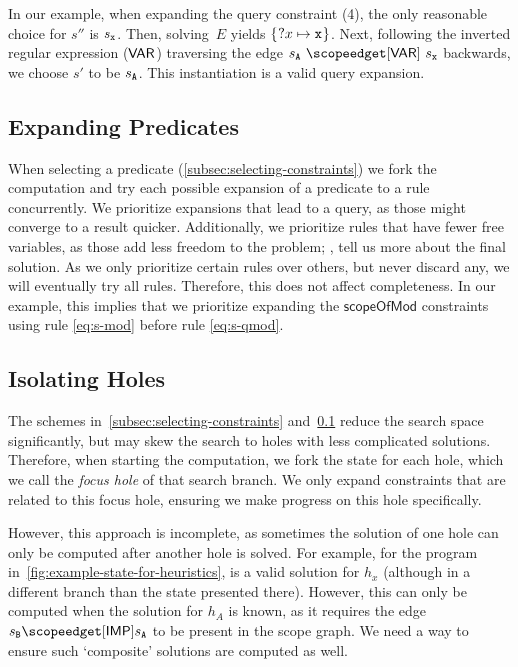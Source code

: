 In our example, when expanding the query constraint (4), the only reasonable choice for $s''$ is $s_{\texttt{x}}$.
Then, solving~$E$ yields $\left\{\mkern1mu \text{?$x$} \mapsto \texttt{x} \mkern1mu\right\}$.
Next, following the inverted regular expression ($\mathsf{VAR}$) traversing the edge $s_\id{A}~\cEdge[\lblVAR]~s_\id{x}$ backwards, we choose $s'$ to be $s_{\texttt{A}}$.
This instantiation is a valid query expansion.


\subsection{Expanding Predicates}%
\label{subsec:expanding-predicates}

When selecting a predicate (\cref{subsec:selecting-constraints}) we fork the computation and try each possible expansion of a predicate to a rule concurrently.
We prioritize expansions that lead to a query, as those might converge to a result quicker.
Additionally, we prioritize rules that have fewer free variables, as those add less freedom to the problem; \ie, tell us more about the final solution.
As we only prioritize certain rules over others, but never discard any, we will eventually try all rules.
Therefore, this does not affect completeness.
In our example, this implies that we prioritize expanding the $\mathsf{scopeOfMod}$ constraints using rule \ref{eq:s-mod} before rule \ref{eq:s-qmod}.



\subsection{Isolating Holes}%
\label{subsec:isolating-holes}

The schemes in~\cref{subsec:selecting-constraints} and~\cref{subsec:expanding-predicates} reduce the search space significantly, %
but may skew the search to holes with less complicated solutions.
Therefore, when starting the computation, we fork the state for each hole, which we call the \emph{focus hole} of that search branch.
We only expand constraints that are related to this focus hole, ensuring we make progress on this hole specifically.

However, this approach is incomplete, as sometimes the solution of one hole can only be computed after another hole is solved.
For example, for the program in~\cref{fig:example-state-for-heuristics},  is a valid solution for $h_x$ (although in a different branch than the state presented there).
However, this can only be computed when the solution for $h_A$ is known, as it requires the edge $s_\id{B} \cEdge[\lblIMP] s_\id{A}$ to be present in the scope graph.
We need a way to ensure such `composite' solutions are computed as well.

